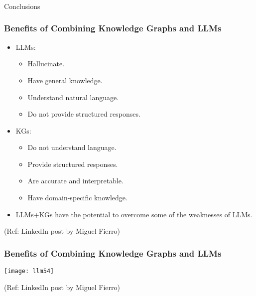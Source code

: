 \begin{frame}[fragile]\frametitle{}
\begin{center}
{\Large Conclusions}

\end{center}
\end{frame}

\begin{frame}[fragile]\frametitle{Benefits of Combining Knowledge Graphs and LLMs}

\begin{itemize}
\item LLMs:
	\begin{itemize}
	\item  Hallucinate.
	\item   Have general knowledge.
	\item   Understand natural language.
	\item   Do not provide structured responses.
	\end{itemize}

\item KGs:
	\begin{itemize}
	\item   Do not understand language.
	\item   Provide structured responses.
	\item   Are accurate and interpretable.
	\item   Have domain-specific knowledge.
	\end{itemize}

\item LLMs+KGs have the potential to overcome some of the weaknesses of LLMs.

\end{itemize}

{\tiny (Ref: LinkedIn post by Miguel Fierro)}


\end{frame}

\begin{frame}[fragile]\frametitle{Benefits of Combining Knowledge Graphs and LLMs}

\begin{center}
\texttt{[image: llm54]}
\end{center}	

{\tiny (Ref: LinkedIn post by Miguel Fierro)}

	
\end{frame}

